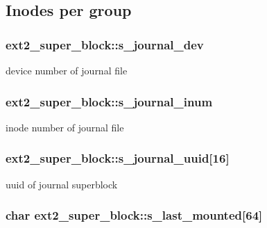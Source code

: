\subsection*{Inodes per group}\hypertarget{structext2__super__block_a5c65ec434f4b1394d6ec68fb8d055a4e}{
\subsubsection[{s\-\_\-journal\-\_\-dev}]{ ext2\-\_\-super\-\_\-block\-::s\-\_\-journal\-\_\-dev}}\label{structext2__super__block_a5c65ec434f4b1394d6ec68fb8d055a4e}
device number of journal file \hypertarget{structext2__super__block_a593535b5ffb1b5480f887e0aae0be698}{
\subsubsection[{s\-\_\-journal\-\_\-inum}]{ ext2\-\_\-super\-\_\-block\-::s\-\_\-journal\-\_\-inum}}\label{structext2__super__block_a593535b5ffb1b5480f887e0aae0be698}
inode number of journal file \hypertarget{structext2__super__block_a31f78875053afe2073c72ab700e831cd}{
\subsubsection[{s\-\_\-journal\-\_\-uuid}]{ ext2\-\_\-super\-\_\-block\-::s\-\_\-journal\-\_\-uuid\mbox{[}16\mbox{]}}}\label{structext2__super__block_a31f78875053afe2073c72ab700e831cd}
uuid of journal superblock \hypertarget{structext2__super__block_ad2849dfeab713d00ddd93c97eaf80cea}{
\subsubsection[{s\-\_\-last\-\_\-mounted}]{\setlength{\rightskip}{0pt plus 5cm}char ext2\-\_\-super\-\_\-block\-::s\-\_\-last\-\_\-mounted\mbox{[}64\mbox{]}}}\label{structext2__super__block_ad2849dfeab713d00ddd93c97eaf80cea}
